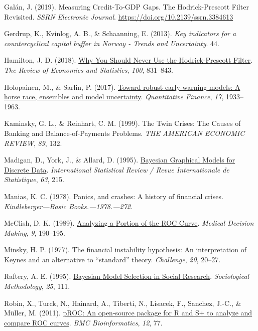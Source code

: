 \documentclass[
  12pt,
]{article}
\newlength{\cslhangindent}
\newlength{\cslentryspacingunit} %
\newenvironment{CSLReferences}[2] %
 {%
  \setlength{\parindent}{0pt}
  \ifodd #1
  \let\oldpar\par
  \def\par{\hangindent=\cslhangindent\oldpar}
  \fi
  \setlength{\parskip}{#2\cslentryspacingunit}
 }%
 {}
\begin{document}
\begin{CSLReferences}{1}{0}
\leavevmode{}%
Galán, J. (2019). Measuring {Credit-To-GDP Gaps}. {The Hodrick-Prescott Filter Revisited}. \emph{SSRN Electronic Journal}. \url{https://doi.org/10.2139/ssrn.3384613}

\leavevmode{}%
Gerdrup, K., Kvinlog, A. B., \& Schaanning, E. (2013). \emph{Key indicators for a countercyclical capital buffer in {Norway} - {Trends} and {Uncertainty}}. 44.

\leavevmode{}%
Hamilton, J. D. (2018). \href{https://doi.org/10.1162/rest_a_00706}{Why {You Should Never Use} the {Hodrick-Prescott Filter}}. \emph{The Review of Economics and Statistics}, \emph{100}, 831--843.

\leavevmode{}%
Holopainen, M., \& Sarlin, P. (2017). \href{https://doi.org/10.1080/14697688.2017.1357972}{Toward robust early-warning models: A horse race, ensembles and model uncertainty}. \emph{Quantitative Finance}, \emph{17}, 1933--1963.

\leavevmode{}%
Kaminsky, G. L., \& Reinhart, C. M. (1999). The {Twin Crises}: {The Causes} of {Banking} and {Balance-of-Payments Problems}. \emph{THE AMERICAN ECONOMIC REVIEW}, \emph{89}, 132.

\leavevmode{}%
Madigan, D., York, J., \& Allard, D. (1995). \href{https://doi.org/10.2307/1403615}{Bayesian {Graphical Models} for {Discrete Data}}. \emph{International Statistical Review / Revue Internationale de Statistique}, \emph{63}, 215.

\leavevmode{}%
Manias, K. C. (1978). Panics, and crashes: {A} history of financial crises. \emph{Kindleberger---Basic Books.---1978.---272}.

\leavevmode{}%
McClish, D. K. (1989). \href{https://doi.org/10.1177/0272989X8900900307}{Analyzing a {Portion} of the {ROC Curve}}. \emph{Medical Decision Making}, \emph{9}, 190--195.

\leavevmode{}%
Minsky, H. P. (1977). The financial instability hypothesis: {An} interpretation of {Keynes} and an alternative to {``standard''} theory. \emph{Challenge}, \emph{20}, 20--27.

\leavevmode{}%
Raftery, A. E. (1995). \href{https://doi.org/10.2307/271063}{Bayesian {Model Selection} in {Social Research}}. \emph{Sociological Methodology}, \emph{25}, 111.

\leavevmode{}%
Robin, X., Turck, N., Hainard, A., Tiberti, N., Lisacek, F., Sanchez, J.-C., \& Müller, M. (2011). \href{https://doi.org/10.1186/1471-2105-12-77}{{pROC}: An open-source package for {R} and {S}+ to analyze and compare {ROC} curves}. \emph{BMC Bioinformatics}, \emph{12}, 77.

\end{CSLReferences}
\end{document}
